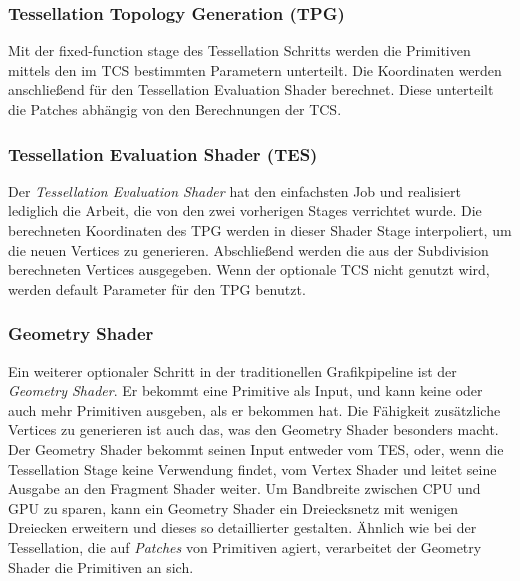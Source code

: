 \subsubsection*{Tessellation Topology Generation (TPG)}
Mit der fixed-function stage des Tessellation Schritts werden die Primitiven mittels den im TCS bestimmten Parametern unterteilt.
Die Koordinaten werden anschließend für den Tessellation Evaluation Shader berechnet.
Diese unterteilt die Patches abhängig von den Berechnungen der TCS.

\subsubsection*{Tessellation Evaluation Shader (TES)}
Der \textit{Tessellation Evaluation Shader} hat den einfachsten Job und realisiert lediglich die Arbeit, die von den zwei vorherigen Stages verrichtet wurde.
Die berechneten Koordinaten des TPG werden in dieser Shader Stage interpoliert, um die neuen Vertices zu generieren.
Abschließend werden die aus der Subdivision berechneten Vertices ausgegeben. 
Wenn der optionale TCS nicht genutzt wird, werden default Parameter für den TPG benutzt. \cite{cozzi2012opengl}\cite{Carvalho2022}

\subsubsection{Geometry Shader}
\label{subsubsec:geometry_shader}
Ein weiterer optionaler Schritt in der traditionellen Grafikpipeline ist der \textit{Geometry Shader}.
Er bekommt eine Primitive als Input, und kann keine oder auch mehr Primitiven ausgeben, als er bekommen hat.
Die Fähigkeit zusätzliche Vertices zu generieren ist auch das, was den Geometry Shader besonders macht.
Der Geometry Shader bekommt seinen Input entweder vom TES, oder, wenn die Tessellation Stage keine Verwendung findet, vom Vertex Shader und leitet seine Ausgabe an den Fragment Shader weiter.
Um Bandbreite zwischen CPU und GPU zu sparen, kann ein Geometry Shader ein Dreiecksnetz mit wenigen Dreiecken erweitern und dieses so detaillierter gestalten.
Ähnlich wie bei der Tessellation, die auf \textit{Patches} von Primitiven agiert, verarbeitet der Geometry Shader die Primitiven an sich.

